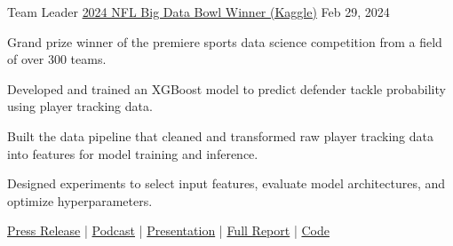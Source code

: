

\begin{cventries}
    
\cventry
{Team Leader} %
{\href{https://operations.nfl.com/gameday/analytics/big-data-bowl/2024-big-data-bowl-winner-and-finalists/}{2024 NFL Big Data Bowl Winner (Kaggle)}}
{} %
{Feb 29, 2024} %
{
  \begin{cvitems} %
    \item {Grand prize winner of the premiere sports data science competition from a field of over 300 teams.}
    \item {Developed and trained an XGBoost model to predict defender tackle probability using player tracking data.}
    \item {Built the data pipeline that cleaned and transformed raw player tracking data into features for model training and inference.}
    \item {Designed experiments to select input features, evaluate model architectures, and optimize hyperparameters.}
    \item {\href{https://operations.nfl.com/gameday/analytics/big-data-bowl/2024-big-data-bowl-winner-and-finalists/}{Press Release} | \href{https://www.trumedianetworks.com/expected-value-podcast/2024/3/12/matt-chang-nfl-big-data-bowl-winner}{Podcast} | \href{https://www.loom.com/share/54c67d584ee34efbb799e8dbbd551091}{Presentation} | \href{https://www.kaggle.com/code/matthewpchang/uncovering-missed-tackle-opportunities}{Full Report} | \href{https://github.com/mpchang/uncovering-missed-tackle-opportunities}{Code}}
  \end{cvitems}
}

\end{cventries}

